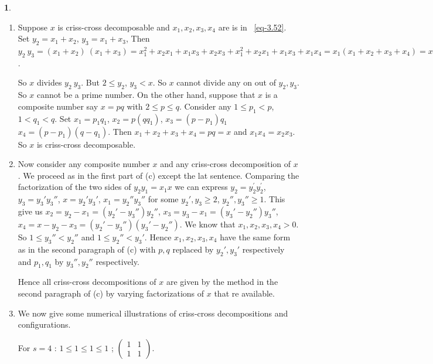 \documentclass[a4paper,12pt]{article}
\theoremstyle{definition}
\theoremstyle{underlinethm}
\theoremstyle{definition}
\newtheorem{subsubsec}{}[subsection]
\begin{document}
\begin{subsubsec}
\begin{enumerate}[label=(\alph*)]
\item Suppose $x$ is criss-cross decomposable and $x_{1}, x_{2}, x_{3}, x_{4}$ are is in ~\eqref{eq-3.52}. Set $y_{2} =x_{1} + x_{2}$, $y_{3} =x_{1} +x_{3}$, Then $y_{2}~y_{3} = \left(x_{1} + x_{2}\right)~\left(x_{1} + x_{3}\right)= x_{1}^{2} + x_{2}x_{1} + x_{1} x_{3} + x_{2}x_{3} + x_{1}^{2} + x_{2}x_{1} +x_{1} x_{3} + x_{1} x_{4} = x_{1} \left(x_{1} + x_{2} + x_{3} + x_{4} \right)= x_{1} x$.  

So $x$ divides $y_{2}~y_{3}$. But $2 \leq y_{2}$, $y_{3} < x$. So $x$ cannot divide any on out of $y_{2}, y_{3}$. So $x$ cannot be a prime number. On the other hand, suppose that $x$ is a composite number say $x=pq$ with $2 \leq p \leq q$. Consider any $1 \leq p_{1} < p$, $1 < q_{1} < q$. Set $x_{1} = p_{1}q_{1}$, $x_{2} = p(qq_{1})$, $x_{3} =(p-p_{1})q_{1}$ $x_{4} = (p-p_{1})(q-q_{1})$. Then $x_{1} + x_{2} + x_{3} + x_{4} = pq =x$ and $x_{1}x_{4} = x_{2}x_{3}$. So $x$ is criss-cross decomposable. 
 
\item Now consider any composite number $x$ and any criss-cross decomposition of $x$. We proceed as in the first part of (c) except the lat sentence. Comparing the factorization of the two sides of $y_{2} y_{1} =x_{1} x$ we can express $y_{2}= y^{'}_{2} y_{2}^{'}$, $y_{3} = y_{3}' y_{3}''$, $x=y_{2}'y_{3}'$, $x_{1} =y_{2}'' y_{3}''$  for some $y_{2}', y_{3} \geq 2$, $y_{2}'', y_{3}'' \geq 1$. This give us $x_{2} = y_{2}-x_{1} =\left(y_{2}'-y_{3}''\right)y_{2}''$, $x_{3} =y_{3} -x_{1} =\left(y_{3}'-y_{2}''\right)y_{3}''$, $x_{4}=x-y_{2}-x_{3} = (y_{2}'-y_{3}'')(y_{3}'-y_{2}'')$.
 We know that $x_{1}, x_{2}, x_{3}, x_{4} > 0$. So $1 \leq y_{3}'' < y_{2}''$ and $1 \leq y_{2}'' < y_{3}'$. Hence $x_{1}, x_{2}, x_{3}, x_{4}$ have the same form as in the second paragraph of (c) with $p,q$ replaced by $y_{2}', y_{3}'$ respectively and $p_{1}, q_{1}$ by $y_{3}'', y_{2}''$ respectively.
 
 Hence all criss-cross decompositions of $x$ are given by the method in the second paragraph of (c) by varying factorizations of $x$ that re available.
 
\item We now give some numerical illustrations of criss-cross decompositions and configurations.

For $s=4$ : $1 \leq 1 \leq 1 \leq 1$  ; $\begin{pmatrix}1 & 1\\ 1 & 1\end{pmatrix}$.


\end{enumerate}
\end{subsubsec}
\end{document}
